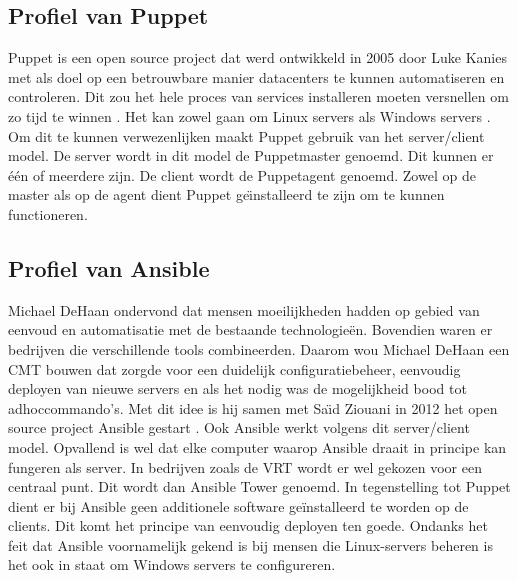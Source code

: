 \subsection{Profiel van Puppet}
Puppet is een open source project dat werd ontwikkeld in 2005 door Luke Kanies \autocite{PuppetLeaders} met als doel op een betrouwbare manier datacenters te kunnen automatiseren en controleren. Dit zou het hele proces van services installeren moeten versnellen om zo tijd te winnen \autocite{how-puppet-works}. Het kan zowel gaan om Linux servers als Windows servers \autocite{PuppetForWindows}. Om dit te kunnen verwezenlijken maakt Puppet gebruik van het server/client model. De server wordt in dit model de Puppetmaster genoemd. Dit kunnen er \'e\'en of meerdere zijn.  De client wordt de Puppetagent genoemd. Zowel op de master als op de agent dient Puppet ge{\"\i}nstalleerd te zijn om te kunnen functioneren. \autocite{puppetdoc} \autocite{puppetfaq}


\subsection{Profiel van Ansible}
Michael DeHaan ondervond dat mensen moeilijkheden hadden op gebied van eenvoud en automatisatie met de bestaande technologie\"en. Bovendien waren er bedrijven die verschillende tools combineerden. Daarom wou Michael DeHaan een \gls{CMT} bouwen dat zorgde voor een duidelijk configuratiebeheer, eenvoudig deployen van nieuwe servers en als het nodig was de mogelijkheid bood tot \gls{adhoccommando}'s. Met dit idee is hij samen met Sa{\"\i}d Ziouani in 2012 het open source project Ansible gestart \autocite{ansiblefordevops}. Ook Ansible werkt volgens dit server/client model. Opvallend is wel dat elke computer waarop Ansible draait in principe kan fungeren als server. In bedrijven zoals de VRT wordt er wel gekozen voor een centraal punt. Dit wordt dan Ansible Tower genoemd. In tegenstelling tot Puppet dient er bij Ansible geen additionele software ge\"installeerd te worden op de clients. Dit komt het principe van eenvoudig deployen ten goede. Ondanks het feit dat Ansible voornamelijk gekend is bij mensen die Linux-servers beheren is het ook in staat om Windows servers te configureren. \autocite{ansibleforwindows}









